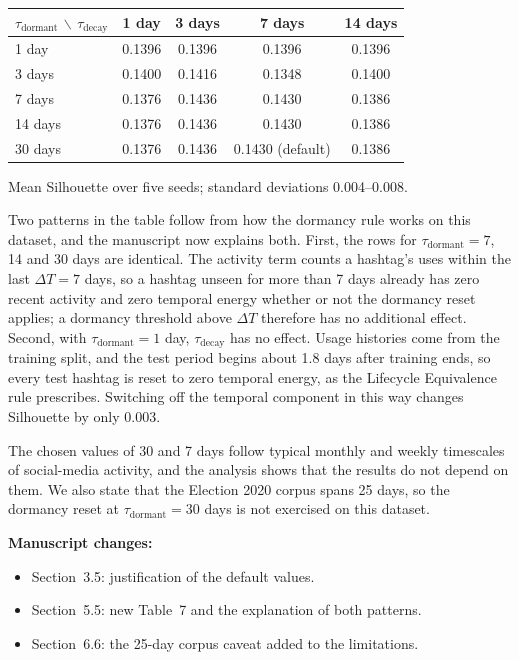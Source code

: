 \documentclass[11pt,a4paper]{article}
\newcommand{\parthead}[1]{\par\medskip\textbf{#1}\par}
\begin{document}
\begin{center}
\small
\begin{tabular}{lcccc}
\toprule
$\tau_{\text{dormant}}$ $\backslash$ $\tau_{\text{decay}}$ & 1 day & 3 days & 7 days & 14 days \\
\midrule
1 day   & 0.1396 & 0.1396 & 0.1396 & 0.1396 \\
3 days  & 0.1400 & 0.1416 & 0.1348 & 0.1400 \\
7 days  & 0.1376 & 0.1436 & 0.1430 & 0.1386 \\
14 days & 0.1376 & 0.1436 & 0.1430 & 0.1386 \\
30 days & 0.1376 & 0.1436 & 0.1430 (default) & 0.1386 \\
\bottomrule
\end{tabular}

{\footnotesize Mean Silhouette over five seeds; standard deviations 0.004--0.008.}
\end{center}

Two patterns in the table follow from how the dormancy rule works on this dataset, and the manuscript now explains both. First, the rows for $\tau_{\text{dormant}} = 7$, 14 and 30 days are identical. The activity term counts a hashtag's uses within the last $\Delta T = 7$ days, so a hashtag unseen for more than 7 days already has zero recent activity and zero temporal energy whether or not the dormancy reset applies; a dormancy threshold above $\Delta T$ therefore has no additional effect. Second, with $\tau_{\text{dormant}} = 1$ day, $\tau_{\text{decay}}$ has no effect. Usage histories come from the training split, and the test period begins about 1.8 days after training ends, so every test hashtag is reset to zero temporal energy, as the Lifecycle Equivalence rule prescribes. Switching off the temporal component in this way changes Silhouette by only 0.003.

The chosen values of 30 and 7 days follow typical monthly and weekly timescales of social-media activity, and the analysis shows that the results do not depend on them. We also state that the Election 2020 corpus spans 25 days, so the dormancy reset at $\tau_{\text{dormant}} = 30$ days is not exercised on this dataset.

\parthead{Manuscript changes:}
\begin{itemize}
\item Section~3.5: justification of the default values.
\item Section~5.5: new Table~7 and the explanation of both patterns.
\item Section~6.6: the 25-day corpus caveat added to the limitations.
\end{itemize}
\end{document}
